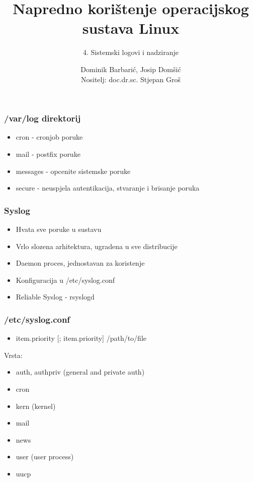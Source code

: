 \documentclass[t,table,usenames,dvipsnames]{beamer}
\date{\todayiso}
\title[NKOSL]{Napredno korištenje operacijskog sustava Linux}
\author[Dominik Barbarić, Josip Domšić]{Dominik Barbarić, Josip Domšić\\{\small Nositelj: doc.dr.sc. Stjepan Groš}}
\subtitle{4. Sistemski logovi i nadziranje}
\institute[FER]{Sveučilište u Zagrebu\\Fakultet elektrotehnike i računarstva}
\begin{document}
{
	\begin{frame}
		\maketitle
	\end{frame}
}

\begin{frame}
    \frametitle{/var/log direktorij}
    \begin{itemize}
        \item cron - cronjob poruke
        \item mail - postfix poruke 
        \item messages - opcenite sistemske poruke  
        \item secure - neuspjela autentikacija, stvaranje i brisanje poruka
    \end{itemize}
\end{frame}


\begin{frame}
    \frametitle{Syslog}
    \begin{itemize}
        \item Hvata sve poruke u sustavu
        \item Vrlo slozena arhitektura, ugradena u sve distribucije
        \item Daemon proces, jednostavan za koristenje
        \item Konfiguracija u /etc/syslog.conf
        \item Reliable Syslog - rsyslogd
    \end{itemize}
\end{frame}

\begin{frame}
    \frametitle{/etc/syslog.conf}
    \begin{itemize}
        \item item.priority [; item.priority]   /path/to/file
    \end{itemize}

    Vrsta: \\
    \begin{itemize}
        \item auth, authpriv (general and private auth)
        \item cron
        \item kern (kernel)
        \item mail
        \item news
        \item user (user process)
        \item uucp
    \end{itemize}
\end{frame}
\end{document}
